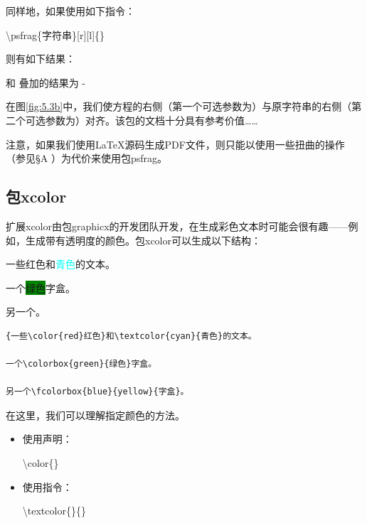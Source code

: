 同样地，如果使用如下指令：

\begin{dmd}
  \backslash psfrag\{字符串\}[r][l]\{\}
\end{dmd}

则有如下结果：

\begin{center}
  \quad 和\quad
   \quad 叠加的结果为 \quad
  \kern-\fboxrule%
\end{center}

在图\ref{fig:5.3b}中，我们使方程的右侧（第一个可选参数为）与原字符串的右侧（第二个可选参数为）对齐。该包的文档十分具有参考价值……

\begin{exclamation}
注意，如果我们使用\LaTeX 源码生成PDF文件，则只能以使用一些扭曲的操作（参见\S A%
）为代价来使用包\textsf{psfrag}。
\end{exclamation}

\subsection{包\textsf{xcolor}}

扩展\textsf{xcolor}由包\textsf{graphicx}的开发团队开发，在生成彩色文本时可能会很有趣——例如，生成带有透明度的颜色。包\textsf{xcolor}可以生成以下结构：

\begin{codelist}[5.6]{
  {一些\color{red}红色}和\textcolor{cyan}{青色}的文本。

  一个\colorbox{green}{绿色}字盒。
  
  另一个。
}
\begin{verbatim}
{一些\color{red}红色}和\textcolor{cyan}{青色}的文本。

一个\colorbox{green}{绿色}字盒。

另一个\fcolorbox{blue}{yellow}{字盒}。\end{verbatim}
\end{codelist}

在这里，我们可以理解指定颜色的方法。

\begin{itemize}
  \item 使用声明：
  
  \begin{dmd}
    \backslash color\{\}
  \end{dmd}

  \item 使用指令：

  \begin{dmd}
  \backslash textcolor\{\}\{\}
  \end{dmd}
\end{itemize}

